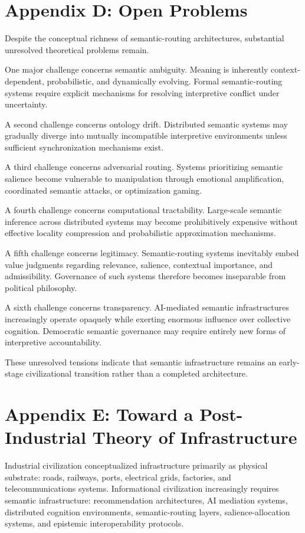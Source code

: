 \documentclass[11pt,a4paper]{article}
\begin{document}
\section{Appendix D: Open Problems}

Despite the conceptual richness of semantic-routing architectures, substantial unresolved theoretical problems remain.

One major challenge concerns semantic ambiguity. Meaning is inherently context-dependent, probabilistic, and dynamically evolving. Formal semantic-routing systems require explicit mechanisms for resolving interpretive conflict under uncertainty.

A second challenge concerns ontology drift. Distributed semantic systems may gradually diverge into mutually incompatible interpretive environments unless sufficient synchronization mechanisms exist.

A third challenge concerns adversarial routing. Systems prioritizing semantic salience become vulnerable to manipulation through emotional amplification, coordinated semantic attacks, or optimization gaming.

A fourth challenge concerns computational tractability. Large-scale semantic inference across distributed systems may become prohibitively expensive without effective locality compression and probabilistic approximation mechanisms.

A fifth challenge concerns legitimacy. Semantic-routing systems inevitably embed value judgments regarding relevance, salience, contextual importance, and admissibility. Governance of such systems therefore becomes inseparable from political philosophy.

A sixth challenge concerns transparency. AI-mediated semantic infrastructures increasingly operate opaquely while exerting enormous influence over collective cognition. Democratic semantic governance may require entirely new forms of interpretive accountability.

These unresolved tensions indicate that semantic infrastructure remains an early-stage civilizational transition rather than a completed architecture.

\section{Appendix E: Toward a Post-Industrial Theory of Infrastructure}

Industrial civilization conceptualized infrastructure primarily as physical substrate: roads, railways, ports, electrical grids, factories, and telecommunications systems. Informational civilization increasingly requires semantic infrastructure: recommendation architectures, AI mediation systems, distributed cognition environments, semantic-routing layers, salience-allocation systems, and epistemic interoperability protocols.
\end{document}
